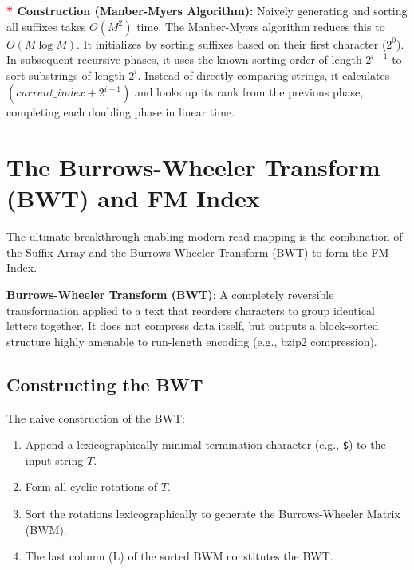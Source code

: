 \documentclass{article}
\newcommand{\sta}{\textbf{\textcolor{red}{* }}}
\begin{document}
\sta \textbf{Construction (Manber-Myers Algorithm):} 
Naively generating and sorting all suffixes takes $O(M^2)$ time. The Manber-Myers algorithm reduces this to $O(M \log M)$. It initializes by sorting suffixes based on their first character ($2^0$). In subsequent recursive phases, it uses the known sorting order of length $2^{i-1}$ to sort substrings of length $2^i$. Instead of directly comparing strings, it calculates $(current\_index + 2^{i-1})$ and looks up its rank from the previous phase, completing each doubling phase in linear time.

\section{The Burrows-Wheeler Transform (BWT) and FM Index}

The ultimate breakthrough enabling modern read mapping is the combination of the Suffix Array and the Burrows-Wheeler Transform (BWT) to form the FM Index.

\begin{important}
    \textbf{Burrows-Wheeler Transform (BWT)}: A completely reversible transformation applied to a text that reorders characters to group identical letters together. It does not compress data itself, but outputs a block-sorted structure highly amenable to run-length encoding (e.g., bzip2 compression).
\end{important}

\subsection{Constructing the BWT}

The naive construction of the BWT:
\begin{enumerate}
    \item Append a lexicographically minimal termination character (e.g., \verb|$|) to the input string $T$.
    \item Form all cyclic rotations of $T$.
    \item Sort the rotations lexicographically to generate the Burrows-Wheeler Matrix (BWM).
    \item The last column (L) of the sorted BWM constitutes the BWT.
\end{enumerate}

\end{document}
